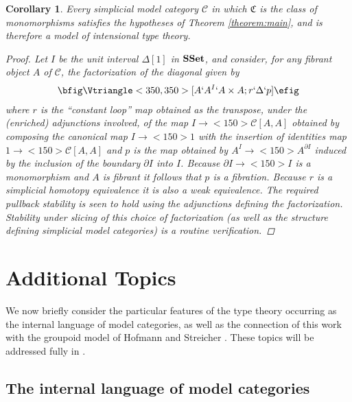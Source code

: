 \documentclass{amsart}
\newcommand{\ssets}{\textnormal{\textbf{SSet}}}
\newtheorem{corollary}[theorem]{Corollary}
\theoremstyle{definition}
\theoremstyle{remark}
\begin{document}
\begin{corollary}
  Every simplicial model category $\mathcal{C}$ in which $\mathfrak{C}$ is
  the class of monomorphisms satisfies the hypotheses of Theorem
  \ref{theorem:main}, and is therefore a model of intensional type theory.
  \begin{proof}
    Let $I$ be the unit interval $\Delta[1]$ in $\ssets$, and consider, for any
    fibrant object $A$ of $\mathcal{C}$, the factorization of the
    diagonal given by 
    \begin{align*}
      \bfig
      \Vtriangle<350,350>[A`A^{I}`A\times A;r`\Delta`p]
      \efig
    \end{align*}
    where $r$ is the ``constant loop'' map obtained as the transpose,
    under the (enriched) adjunctions involved, of the map 
    $I\to<150>\mathcal{C}[A,A]$ obtained by composing the canonical
    map $I\to<150>1$ with the insertion of identities map
    $1\to<150>\mathcal{C}[A,A]$ and $p$ is the map obtained by
    $A^{I}\to<150>A^{\partial I}$ induced by the inclusion of the
    boundary $\partial I$ into $I$.  Because $\partial I\to<150>I$ is
    a monomorphism and $A$ is fibrant it follows that $p$ is a
    fibration.  Because $r$ is a simplicial homotopy equivalence it is
    also a weak equivalence.  The required pullback stability is seen
    to hold using the adjunctions defining the
    factorization.  Stability under slicing of this choice of
    factorization (as well as the structure defining simplicial model
    categories) is a routine verification.
  \end{proof}
\end{corollary}

\section{Additional Topics}\label{section:coherence}

We now briefly consider the particular features of the type theory occurring as the internal
language of model categories, as well as the connection of this work
with the groupoid model of Hofmann and Streicher \cite{Hofmann:GITT}.
These topics will be addressed fully in \cite{Warren:PhD}. 

\subsection{The internal language of model categories}
\end{document}
